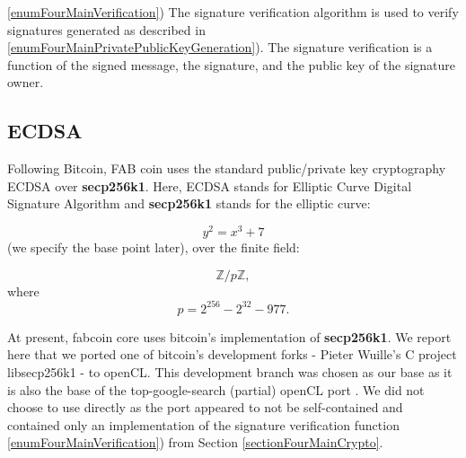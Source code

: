\documentclass{article}
\newcommand{\secpTwoFiveSixKone}{{\bf secp256k1}}
\begin{document}
\noindent\ref{enumFourMainVerification}) The signature verification algorithm is used to verify signatures generated as described in \ref{enumFourMainPrivatePublicKeyGeneration}). The signature verification is a function of the signed message, the signature, and the public key of the signature owner.

\subsection{ECDSA}\label{sectionECDSAgeneral}
Following Bitcoin, FAB coin uses the standard public/private key cryptography ECDSA over \secpTwoFiveSixKone. Here, ECDSA stands for Elliptic Curve Digital Signature Algorithm and \secpTwoFiveSixKone{} stands for the elliptic curve:

\[
y^2 = x^3 + 7
\]
(we specify the base point later), over the finite field:

\[
\mathbb Z / p\mathbb Z, 
\]
where
\begin{equation}\label{eqThePrime}
p= 2^{256} - 2^{32} - 977.
\end{equation}

At present, fabcoin core uses bitcoin's implementation of \secpTwoFiveSixKone{}. We report here that we ported one of bitcoin's development forks - Pieter Wuille's C project libsecp256k1 \cite{Wuille:secp256k1}  - to openCL. This development branch was chosen as our base as it is also the base of the top-google-search (partial) openCL port \cite{secp256k1:openCLimplementationHanh0}. We did not choose to use \cite{secp256k1:openCLimplementationHanh0} directly as the port appeared to not be self-contained and contained only an implementation of the signature verification function \ref{enumFourMainVerification})  from Section \ref{sectionFourMainCrypto}.




\end{document}
